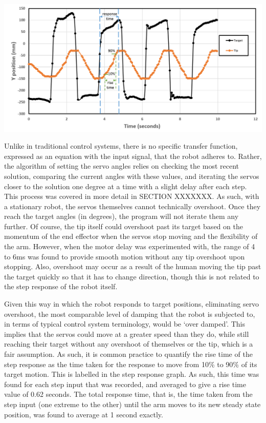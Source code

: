\documentclass[11pt]{article}
\begin{document}
\begin{center}
\includegraphics[width=\textwidth]{images/stepResponse.png}
\label{figure:stepResponse}
\end{center}

Unlike in traditional control systems, there is no specific transfer function, expressed as an equation with the input signal, that the robot adheres to. Rather, the algorithm of setting the servo angles relies on checking the most recent solution, comparing the current angles with these values, and iterating the servos closer to the solution one degree at a time with a slight delay after each step. This process was covered in more detail in SECTION XXXXXXX. As such, with a stationary robot, the servos themselves cannot technically overshoot. Once they reach the target angles (in degrees), the program will not iterate them any further. Of course, the tip itself could overshoot past its target based on the momentum of the end effector when the servos stop moving and the flexibility of the arm. However, when the motor delay was experimented with, the range of 4 to 6ms was found to provide smooth motion without any tip overshoot upon stopping. Also, overshoot may occur as a result of the human moving the tip past the target quickly so that it has to change direction, though this is not related to the step response of the robot itself. 

Given this way in which the robot responds to target positions, eliminating servo overshoot, the most comparable level of damping that the robot is subjected to, in terms of typical control system terminology, would be `over damped'. This implies that the servos could move at a greater speed than they do, while still reaching their target without any overshoot of themselves or the tip, which is a fair assumption. As such, it is common practice to quantify the rise time of the step response as the time taken for the response to move from 10\% to 90\% of its target motion. This is labelled in the step response graph. As such, this time was found for each step input that was recorded, and averaged to give a rise time value of 0.62 seconds. The total response time, that is, the time taken from the step input (one extreme to the other) until the arm moves to its new steady state position, was found to average at 1 second exactly. 
\end{document}
